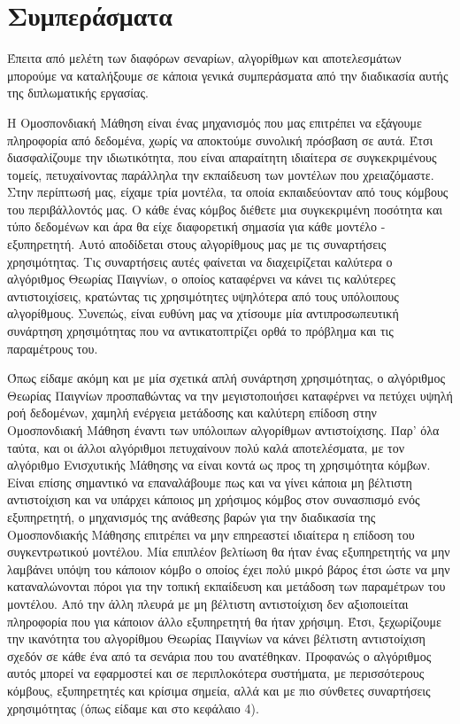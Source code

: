 \chapter{Συμπεράσματα}

Έπειτα από μελέτη των διαφόρων σεναρίων, αλγορίθμων και αποτελεσμάτων μπορούμε να καταλήξουμε σε κάποια γενικά συμπεράσματα από την διαδικασία αυτής της διπλωματικής εργασίας.

Η Ομοσπονδιακή Μάθηση είναι ένας μηχανισμός που μας επιτρέπει να εξάγουμε πληροφορία από δεδομένα, χωρίς να αποκτούμε συνολική πρόσβαση σε αυτά. Έτσι διασφαλίζουμε την ιδιωτικότητα, που είναι απαραίτητη ιδιαίτερα σε συγκεκριμένους τομείς, πετυχαίνοντας παράλληλα την εκπαίδευση των μοντέλων που χρειαζόμαστε. Στην περίπτωσή μας, είχαμε τρία μοντέλα, τα οποία εκπαιδεύονταν από τους κόμβους του περιβάλλοντός μας. Ο κάθε ένας κόμβος διέθετε μια συγκεκριμένη ποσότητα και τύπο δεδομένων και άρα θα είχε διαφορετική σημασία για κάθε μοντέλο - εξυπηρετητή. Αυτό αποδίδεται στους αλγορίθμους μας με τις συναρτήσεις χρησιμότητας. Τις συναρτήσεις αυτές φαίνεται να διαχειρίζεται καλύτερα ο αλγόριθμος Θεωρίας Παιγνίων, ο οποίος καταφέρνει να κάνει τις καλύτερες αντιστοιχίσεις, κρατώντας τις χρησιμότητες υψηλότερα από τους υπόλοιπους αλγορίθμους. Συνεπώς, είναι ευθύνη μας να χτίσουμε μία αντιπροσωπευτική συνάρτηση χρησιμότητας που να αντικατοπτρίζει ορθά το πρόβλημα και τις παραμέτρους του. 

Όπως είδαμε ακόμη και με μία σχετικά απλή συνάρτηση χρησιμότητας, ο αλγόριθμος Θεωρίας Παιγνίων προσπαθώντας να την μεγιστοποιήσει καταφέρνει να πετύχει υψηλή ροή δεδομένων, χαμηλή ενέργεια μετάδοσης και καλύτερη επίδοση στην Ομοσπονδιακή Μάθηση έναντι των υπόλοιπων αλγορίθμων αντιστοίχισης. Παρ' όλα ταύτα, και οι άλλοι αλγόριθμοι πετυχαίνουν πολύ καλά αποτελέσματα, με τον αλγόριθμο Ενισχυτικής Μάθησης να είναι κοντά ως προς τη χρησιμότητα κόμβων. Είναι επίσης σημαντικό να επαναλάβουμε πως και να γίνει κάποια μη βέλτιστη αντιστοίχιση και να υπάρχει κάποιος μη χρήσιμος κόμβος στον συνασπισμό ενός εξυπηρετητή, ο μηχανισμός της ανάθεσης βαρών για την διαδικασία της Ομοσπονδιακής Μάθησης επιτρέπει να μην επηρεαστεί ιδιαίτερα η επίδοση του συγκεντρωτικού μοντέλου. Μία επιπλέον βελτίωση θα ήταν ένας εξυπηρετητής να μην λαμβάνει υπόψη του κάποιον κόμβο ο οποίος έχει πολύ μικρό βάρος έτσι ώστε να μην καταναλώνονται πόροι για την τοπική εκπαίδευση και μετάδοση των παραμέτρων του μοντέλου. Από την άλλη πλευρά με μη βέλτιστη αντιστοίχιση δεν αξιοποιείται πληροφορία που για κάποιον άλλο εξυπηρετητή θα ήταν χρήσιμη. Έτσι, ξεχωρίζουμε την ικανότητα του αλγορίθμου Θεωρίας Παιγνίων να κάνει βέλτιστη αντιστοίχιση σχεδόν σε κάθε ένα από τα σενάρια που του ανατέθηκαν. Προφανώς ο αλγόριθμος αυτός μπορεί να εφαρμοστεί και σε περιπλοκότερα συστήματα, με περισσότερους κόμβους, εξυπηρετητές και κρίσιμα σημεία, αλλά και με πιο σύνθετες συναρτήσεις χρησιμότητας (όπως είδαμε και στο κεφάλαιο 4).

